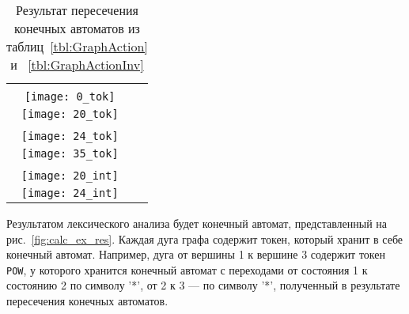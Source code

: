 \documentclass[10pt, conference, compsocconf]{IEEEtran}
\begin{document}
\begin{table}[h]
  \centering
  \begin{tabular}{ | c | c |}
    \hline 
    \begin{minipage}{.2\textwidth}
    \vspace{1 mm} \\
      \texttt{[image: 0\_tok]}
    \end{minipage}
    &
    \begin{minipage}{.2\textwidth}
    \vspace{1 mm} \\
      \texttt{[image: 20\_tok]}
    \end{minipage}
    \\ \hline
    
    \begin{minipage}{.2\textwidth}
    \vspace{1 mm} \\
      \texttt{[image: 24\_tok]}
    \end{minipage}
    &
    \begin{minipage}{.2\textwidth}
    \vspace{1 mm} \\
      \texttt{[image: 35\_tok]}
    \end{minipage}
    \\ \hline
    
    \begin{minipage}{.2\textwidth}
    \vspace{1 mm} \\
      \texttt{[image: 20\_int]}   
    \end{minipage}
    & 
    \begin{minipage}{.2\textwidth}
    \vspace{1 mm} \\
      \texttt{[image: 24\_int]}
    \end{minipage}
    \\ \hline
  \end{tabular}
  \caption{Результат пересечения конечных автоматов из таблиц~\ref{tbl:GraphAction} и ~\ref{tbl:GraphActionInv}}
  \label{tbl:GraphActionInters}
\end{table}

Результатом лексического анализа будет конечный автомат, представленный на рис.~\ref{fig:calc_ex_res}. Каждая дуга графа содержит токен, который хранит в себе конечный автомат. Например, дуга от вершины 1 к вершине 3 содержит токен \verb|POW|, у которого хранится конечный автомат с переходами от состояния 1 к состоянию 2 по символу '*', от 2 к 3 --- по символу '*', полученный в результате пересечения конечных автоматов. 
\end{document}

